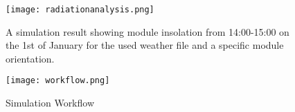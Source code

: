

\begin{figure}
\begin{center}
\texttt{[image: radiationanalysis.png]}
\caption{A simulation result showing module insolation from 14:00-15:00 on the 1st of January for the used weather file and a specific module orientation.}
\label{fig:radiation}
\end{center}
\end{figure}


\begin{figure}
\begin{center}
\texttt{[image: workflow.png]}
\caption{Simulation Workflow}
\label{fig:workflow}
\end{center}
\end{figure}